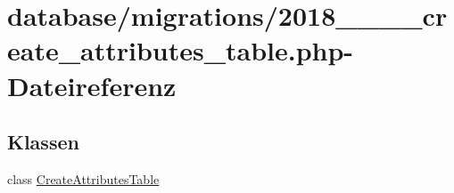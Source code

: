 \hypertarget{2018__06__15__144445__create__attributes__table_8php}{}\section{database/migrations/2018\+\_\+\_\+\_\+\_\+create\+\_\+attributes\+\_\+table.php-\/\+Dateireferenz}
\label{2018__06__15__144445__create__attributes__table_8php}
\subsection*{Klassen}
\begin{DoxyCompactItemize}
\item 
class \hyperlink{classCreateAttributesTable}{Create\+Attributes\+Table}
\end{DoxyCompactItemize}
